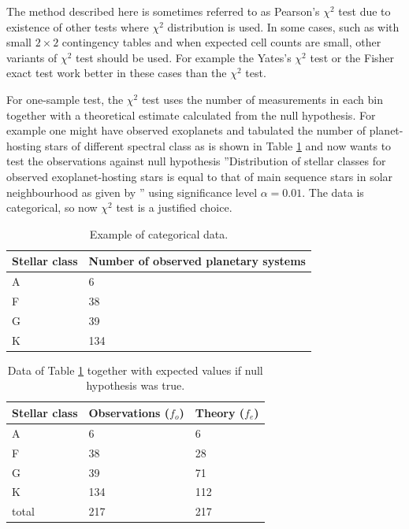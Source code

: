 \documentclass[english, oneside]{HYgradu}
\begin{document}
The method described here is sometimes referred to as Pearson's $\chi^2$ test due to existence of other tests where $\chi^2$ distribution is used. In some cases, such as with small $2 \times 2$ contingency tables and when expected cell counts are small, other variants of $\chi^2$ test should be used. For example the Yates's $\chi^2$ test or the Fisher exact test work better in these cases than the $\chi^2$ test.

For one-sample test, the $\chi^2$ test uses the number of measurements in each bin together with a theoretical estimate calculated from the null hypothesis. For example one might have observed exoplanets and tabulated the number of planet-hosting stars of different spectral class as is shown in Table \ref{tab:exoplanets} and now wants 
to test the observations against null hypothesis ''Distribution of stellar classes for observed exoplanet-hosting stars is equal to that of main sequence stars in solar neighbourhood as given by \citet{ledrew2001real}'' using significance level $\alpha=0.01$. The data is categorical, so now $\chi^2$ test is a justified choice.

\begin{table}
	\centering
	\begin{tabular}{p{2cm}|p{4cm}}
		Stellar class & Number of observed planetary systems \\ \hline
		A & 6 \\
		F & 38 \\
		G & 39 \\
		K & 134
	\end{tabular}
	\caption{Example of categorical data.}
	\label{tab:exoplanets}
\end{table}

\begin{table}
	\centering
	\begin{tabular}{ l | l | l }
		Stellar class & Observations ($f_o$)& Theory ($f_e$) \\ \hline
		A & 6 & 6 \\
		F & 38 & 28 \\
		G & 39 & 71 \\
		K & 134 & 112 \\ \hline
		total & 217 & 217
	\end{tabular}
	\caption{Data of Table \ref{tab:exoplanets} together with expected values if null hypothesis was true.}
	\label{tab:exoplanets-null}
\end{table}
\end{document}
